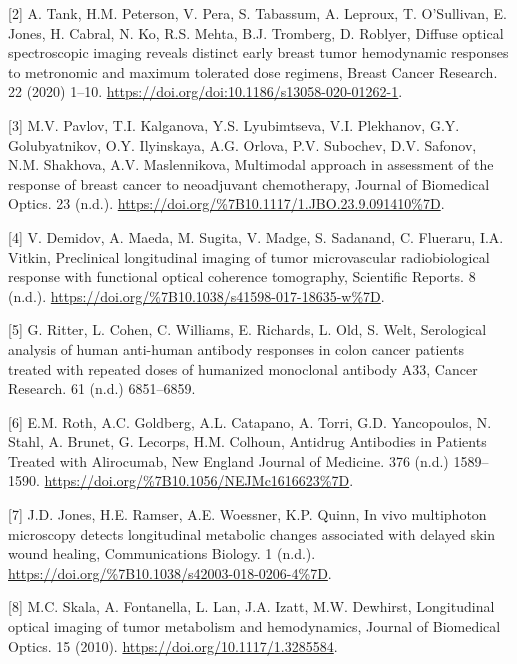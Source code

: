 \documentclass[
]{article}
\begin{document}
\leavevmode\hypertarget{ref-tank2020}{}%
{[}2{]} A. Tank, H.M. Peterson, V. Pera, S. Tabassum, A. Leproux, T. O'Sullivan, E. Jones, H. Cabral, N. Ko, R.S. Mehta, B.J. Tromberg, D. Roblyer, Diffuse optical spectroscopic imaging reveals distinct early breast tumor hemodynamic responses to metronomic and maximum tolerated dose regimens, Breast Cancer Research. 22 (2020) 1--10. \url{https://doi.org/doi:10.1186/s13058-020-01262-1}.

\leavevmode\hypertarget{ref-pavlov2018}{}%
{[}3{]} M.V. Pavlov, T.I. Kalganova, Y.S. Lyubimtseva, V.I. Plekhanov, G.Y. Golubyatnikov, O.Y. Ilyinskaya, A.G. Orlova, P.V. Subochev, D.V. Safonov, N.M. Shakhova, A.V. Maslennikova, Multimodal approach in assessment of the response of breast cancer to neoadjuvant chemotherapy, Journal of Biomedical Optics. 23 (n.d.). \url{https://doi.org/\%7B10.1117/1.JBO.23.9.091410\%7D}.

\leavevmode\hypertarget{ref-demidov2018}{}%
{[}4{]} V. Demidov, A. Maeda, M. Sugita, V. Madge, S. Sadanand, C. Flueraru, I.A. Vitkin, Preclinical longitudinal imaging of tumor microvascular radiobiological response with functional optical coherence tomography, Scientific Reports. 8 (n.d.). \url{https://doi.org/\%7B10.1038/s41598-017-18635-w\%7D}.

\leavevmode\hypertarget{ref-ritter2001}{}%
{[}5{]} G. Ritter, L. Cohen, C. Williams, E. Richards, L. Old, S. Welt, Serological analysis of human anti-human antibody responses in colon cancer patients treated with repeated doses of humanized monoclonal antibody A33, Cancer Research. 61 (n.d.) 6851--6859.

\leavevmode\hypertarget{ref-roth2017}{}%
{[}6{]} E.M. Roth, A.C. Goldberg, A.L. Catapano, A. Torri, G.D. Yancopoulos, N. Stahl, A. Brunet, G. Lecorps, H.M. Colhoun, Antidrug Antibodies in Patients Treated with Alirocumab, New England Journal of Medicine. 376 (n.d.) 1589--1590. \url{https://doi.org/\%7B10.1056/NEJMc1616623\%7D}.

\leavevmode\hypertarget{ref-jones2018}{}%
{[}7{]} J.D. Jones, H.E. Ramser, A.E. Woessner, K.P. Quinn, In vivo multiphoton microscopy detects longitudinal metabolic changes associated with delayed skin wound healing, Communications Biology. 1 (n.d.). \url{https://doi.org/\%7B10.1038/s42003-018-0206-4\%7D}.

\leavevmode\hypertarget{ref-skala2010}{}%
{[}8{]} M.C. Skala, A. Fontanella, L. Lan, J.A. Izatt, M.W. Dewhirst, Longitudinal optical imaging of tumor metabolism and hemodynamics, Journal of Biomedical Optics. 15 (2010). \url{https://doi.org/10.1117/1.3285584}.
\end{document}
